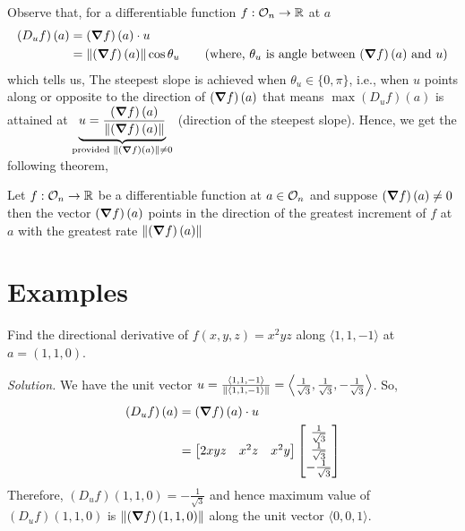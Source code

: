 \documentclass[../Analysis-3.tex]{subfiles}
\begin{document}
Observe that, for a differentiable function $ f: \mathcal{O}_{n} \to \mathbb{R} $ at $ a $
\begin{align*}
  \left( D_uf \right)\left( a \right)
   & = \left( \grad f\right)\left( a \right)\cdot u                                                                                                        \\
   & = \norm{\left( \grad f\right)\left( a \right)}\cos{\theta_u} \tag{where, $\theta_u$ is angle between $\left( \grad f\right)\left( a \right)$ and $u$}
\end{align*}
which tells us, The steepest slope is achieved when $ \theta_u \in \{0, \pi\} $, i.e., when $ u $ points along or opposite to the direction of $ \left( \grad f\right)\left( a \right) $
that means $ \max \left( D_uf \right)\left( a \right) $ is attained at $ \underbrace{u = \frac{\left( \grad f\right)\left( a \right)}{\norm{\left( \grad f\right)\left( a \right)}}}_{\text{provided } \norm{\left( \grad f\right)\left( a \right)} \not=0 } $ (direction of the steepest slope).
Hence, we get the following theorem,
\begin{Thm}{}{}
  Let $ f: \mathcal{O}_{n} \to \mathbb{R} $ be a differentiable function at $ a \in \mathcal{O}_{n} $ and suppose $ \left( \grad f\right)\left( a \right) \not= 0 $ then the vector $\left( \grad f\right)\left( a \right)$ points in the direction of the greatest increment of $ f $ at $ a $ with the greatest rate $ \norm{\left( \grad f\right)\left( a \right)} $
\end{Thm}

\section{Examples}

\begin{Eg}{}{}
  Find the directional derivative of $ f(x,y,z) = x^2yz $ along $ \langle 1,1,-1 \rangle $ at $ a = (1,1,0) $.
  
  \textit{Solution.} We have the unit vector $ u = \frac{\langle 1,1,-1 \rangle}{\norm{\langle 1,1,-1 \rangle}} = \left\langle \frac{1}{\sqrt{3}}, \frac{1}{\sqrt{3}}, -\frac{1}{\sqrt{3}} \right\rangle $. So,
  \begin{align*}
    \left( D_uf \right)\left( a \right)
     & = \left( \grad f\right)\left( a \right)\cdot u                                                                                       \\
     & = \begin{bmatrix} 2xyz & x^2z & x^2y \end{bmatrix}
    \begin{bmatrix} \frac{1}{\sqrt{3}} \\ \frac{1}{\sqrt{3}} \\ -\frac{1}{\sqrt{3}} \end{bmatrix} \\
  \end{align*}
  Therefore, $ \left( D_uf \right)(1,1,0) = -\frac{1}{\sqrt{3}} $ and hence maximum value of $ \left( D_uf \right)(1,1,0) $ is $ \norm{\left( \grad f\right)(1,1,0)} $ along the unit vector $ \langle 0,0,1 \rangle $.
\end{Eg}
\end{document}
